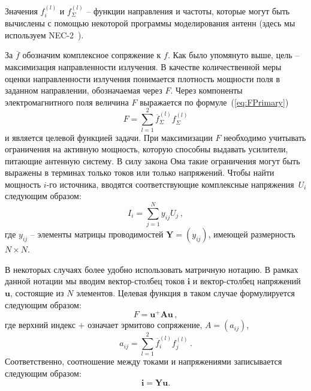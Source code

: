 Значения $f_i^{(l)}$ и $f^{(l)}_{\Sigma}$ -- функции направления и частоты, которые могут быть вычислены с помощью некоторой программы моделирования антенн (здесь мы используем NEC-2~\cite{bruke:nec2}).

За $\overline{f}$ обозначим комплексное сопряжение к $f$. Как было упомянуто выше, цель -- максимизация направленности излучения. В качестве количественной меры оценки направленности излучения понимается плотность мощности поля в заданном направлении, обозначаемая через $F$. Через компоненты электромагнитного поля величина $F$ выражается по формуле~(\ref{eq:FPrimary})
%
    \begin{equation}
        F = \sum_{l=1}^{2}\overline{f}_{\Sigma}^{(l)}f_{\Sigma}^{(l)}
        \label{eq:FPrimary}
    \end{equation}
%
и является целевой функцией задачи. При максимизации $F$ необходимо учитывать ограничения на активную мощность, которую способны выдавать усилители, питающие антенную систему. В силу закона Ома такие ограничения могут быть выражены в терминах только токов или только напряжений. Чтобы найти мощность $i$-го источника, вводятся соответствующие комплексные напряжения~$U_i$ следующим образом:
%
    \begin{equation}
        I_i = \sum_{j=1}^{N}y_{ij}U_j \, ,
        \label{eq:om}
    \end{equation}
%
где $y_{ij}$ -- элементы матрицы проводимостей $\textbf{Y} = (y_{ij})$, имеющей размерность $N \times N$.

В некоторых случаях более удобно использовать матричную нотацию. В рамках данной нотации мы вводим вектор-столбец токов $\textbf{i}$ и вектор-столбец напряжений $\textbf{u}$, состоящие из $N$ элементов. Целевая функция в таком случае формулируется следующим образом:
%
    \begin{equation}
        F = \textbf{u}^{+}\textbf{Au} \, ,
        \label{eq:F}
    \end{equation}
%
где верхний индекс $+$ означает эрмитово сопряжение, $A = (a_{ij})$,
%
     \begin{equation}
        a_{ij} = \sum_{l=1}^2\overline{f}_{i}^{(l)}f_{j}^{(l)}
        \label{eq:A} \, .
    \end{equation}
%
Соответственно, соотношение между токами и напряжениями записывается следующим образом:
%
    \begin{equation}
    \textbf{i}=\textbf{Y}\textbf{u} .
    \end{equation}
%


